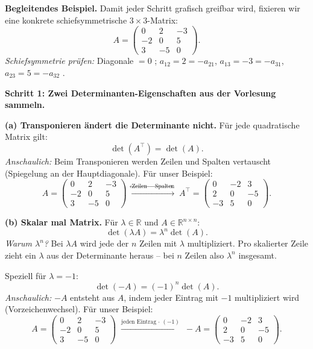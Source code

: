 \documentclass[a4paper,12pt]{article}
\begin{document}
\medskip

\textbf{Begleitendes Beispiel.} Damit jeder Schritt grafisch greifbar wird, fixieren wir eine konkrete schiefsymmetrische $3 \times 3$-Matrix:
\[
A = \begin{pmatrix} 0 & 2 & -3 \\ -2 & 0 & 5 \\ 3 & -5 & 0 \end{pmatrix}.
\]
\emph{Schiefsymmetrie pr\"ufen:} Diagonale $= 0$ \checkmark; \;$a_{12} = 2 = -a_{21}$, \;$a_{13} = -3 = -a_{31}$, \;$a_{23} = 5 = -a_{32}$ \checkmark.

\medskip

\textbf{Schritt 1: Zwei Determinanten-Eigenschaften aus der Vorlesung sammeln.}

\textbf{(a) Transponieren \"andert die Determinante nicht.} F\"ur jede quadratische Matrix gilt:
\[
\det(A^\top) = \det(A).
\]
\emph{Anschaulich:} Beim Transponieren werden Zeilen und Spalten vertauscht (Spiegelung an der Hauptdiagonale). F\"ur unser Beispiel:
\[
A = \begin{pmatrix} 0 & 2 & -3 \\ -2 & 0 & 5 \\ 3 & -5 & 0 \end{pmatrix}
\;\xrightarrow{\text{Zeilen}\,\leftrightarrow\,\text{Spalten}}\;
A^\top = \begin{pmatrix} 0 & -2 & 3 \\ 2 & 0 & -5 \\ -3 & 5 & 0 \end{pmatrix}.
\]

\textbf{(b) Skalar mal Matrix.} F\"ur $\lambda \in \mathbb{R}$ und $A \in \mathbb{R}^{n \times n}$:
\[
\det(\lambda A) = \lambda^n \det(A).
\]
\emph{Warum $\lambda^n$?} Bei $\lambda A$ wird jede der $n$ Zeilen mit $\lambda$ multipliziert. Pro skalierter Zeile zieht ein $\lambda$ aus der Determinante heraus -- bei $n$ Zeilen also $\lambda^n$ insgesamt.

Speziell f\"ur $\lambda = -1$:
\[
\det(-A) = (-1)^n \det(A).
\]
\emph{Anschaulich:} $-A$ entsteht aus $A$, indem jeder Eintrag mit $-1$ multipliziert wird (Vorzeichenwechsel). F\"ur unser Beispiel:
\[
A = \begin{pmatrix} 0 & 2 & -3 \\ -2 & 0 & 5 \\ 3 & -5 & 0 \end{pmatrix}
\;\xrightarrow{\text{jeden Eintrag}\,\cdot\,(-1)}\;
-A = \begin{pmatrix} 0 & -2 & 3 \\ 2 & 0 & -5 \\ -3 & 5 & 0 \end{pmatrix}.
\]
\end{document}

